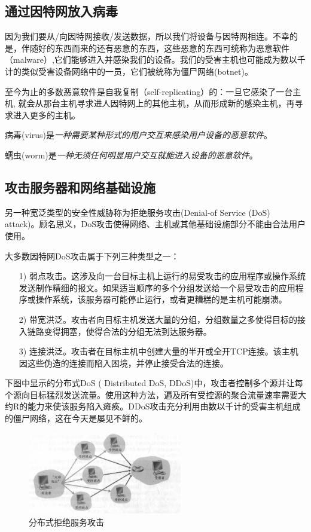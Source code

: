\subsection{通过因特网放入病毒}

    因为我们要从/向因特网接收/发送数据，所以我们将设备与因特网相连。不幸的是，伴随好的东西而来的还有恶意的东西，这些恶意的东西可统称为恶意软件（malware）,它们能够进入并感染我们的设备。我们的受害主机也可能成为数以千计的类似受害设备网络中的一员，它们被统称为僵尸网络(botnet)。

    至今为止的多数恶意软件是自我复制（self-replicating）的：一旦它感染了一台主机, 就会从那台主机寻求进人因特网上的其他主机，从而形成新的感染主机，再寻求进入更多的主机。

    病毒(virus)是\emph{一种需要某种形式的用户交互来感染用户设备的恶意软件}。

    蠕虫(worm)是\emph{一种无须任何明显用户交互就能进入设备的恶意软件}。

\subsection{攻击服务器和网络基础设施}

    另一种宽泛类型的安全性威胁称为拒绝服务攻击(Denial-of Service (DoS) attack)。顾名思义，DoS攻击使得网络、主机或其他基础设施部分不能由合法用户使用。

    大多数因特网DoS攻击属于下列三种类型之一：

\begin{itemize}
    \item [1)] 弱点攻击。这涉及向一台目标主机上运行的易受攻击的应用程序或操作系统发送制作精细的报文。如果适当顺序的多个分组发送给一个易受攻击的应用程序或操作系统，该服务器可能停止运行，或者更糟糕的是主机可能崩溃。
    \item [2)] 带宽洪泛。攻击者向目标主机发送大量的分组，分组数量之多使得目标的接入链路变得拥塞，使得合法的分组无法到达服务器。
    \item [3)] 连接洪泛。攻击者在目标主机中创建大量的半开或全开TCP连接。该主机因这些伪造的连接而陷入困境，并停止接受合法的连接。
\end{itemize}

    下图中显示的分布式DoS ( Distributed DoS, DDoS)中，攻击者控制多个源并让每个源向目标猛烈发送流量。使用这种方法，遍及所有受控源的聚合流量速率需要大约R的能力来使该服务陷入瘫痪。DDoS攻击充分利用由数以千计的受害主机组成的僵尸网络，这在今天是屡见不鲜的。

\begin{figure}[!htbp]
    \centering
    \includegraphics[width=0.6\textwidth]{image/chapter01/分布式拒绝服务攻击DDOS.png}
    \caption{分布式拒绝服务攻击}
\end{figure}

